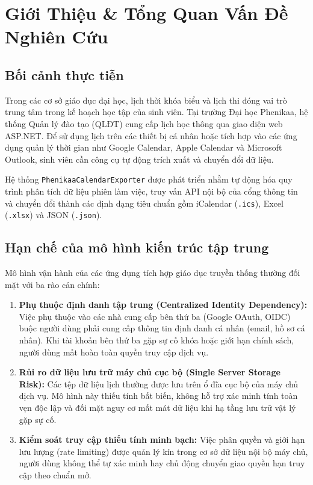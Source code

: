 \documentclass[11pt,a4paper]{article}
\begin{document}
\newpage
\tableofcontents
\newpage

\section{Giới Thiệu \& Tổng Quan Vấn Đề Nghiên Cứu}

\subsection{Bối cảnh thực tiễn}
Trong các cơ sở giáo dục đại học, lịch thời khóa biểu và lịch thi đóng vai trò trung tâm trong kế hoạch học tập của sinh viên. Tại trường Đại học Phenikaa, hệ thống Quản lý đào tạo (QLĐT) cung cấp lịch học thông qua giao diện web ASP.NET. Để sử dụng lịch trên các thiết bị cá nhân hoặc tích hợp vào các ứng dụng quản lý thời gian như Google Calendar, Apple Calendar và Microsoft Outlook, sinh viên cần công cụ tự động trích xuất và chuyển đổi dữ liệu.

Hệ thống \texttt{PhenikaaCalendarExporter} được phát triển nhằm tự động hóa quy trình phân tích dữ liệu phiên làm việc, truy vấn API nội bộ của cổng thông tin và chuyển đổi thành các định dạng tiêu chuẩn gồm iCalendar (\texttt{.ics}), Excel (\texttt{.xlsx}) và JSON (\texttt{.json}).

\subsection{Hạn chế của mô hình kiến trúc tập trung}
Mô hình vận hành của các ứng dụng tích hợp giáo dục truyền thống thường đối mặt với ba rào cản chính:
\begin{enumerate}
    \item \textbf{Phụ thuộc định danh tập trung (Centralized Identity Dependency):} Việc phụ thuộc vào các nhà cung cấp bên thứ ba (Google OAuth, OIDC) buộc người dùng phải cung cấp thông tin định danh cá nhân (email, hồ sơ cá nhân). Khi tài khoản bên thứ ba gặp sự cố khóa hoặc giới hạn chính sách, người dùng mất hoàn toàn quyền truy cập dịch vụ.
    \item \textbf{Rủi ro dữ liệu lưu trữ máy chủ cục bộ (Single Server Storage Risk):} Các tệp dữ liệu lịch thường được lưu trên ổ đĩa cục bộ của máy chủ dịch vụ. Mô hình này thiếu tính bất biến, không hỗ trợ xác minh tính toàn vẹn độc lập và đối mặt nguy cơ mất mát dữ liệu khi hạ tầng lưu trữ vật lý gặp sự cố.
    \item \textbf{Kiểm soát truy cập thiếu tính minh bạch:} Việc phân quyền và giới hạn lưu lượng (rate limiting) được quản lý kín trong cơ sở dữ liệu nội bộ máy chủ, người dùng không thể tự xác minh hay chủ động chuyển giao quyền hạn truy cập theo chuẩn mở.
\end{enumerate}
\end{document}
